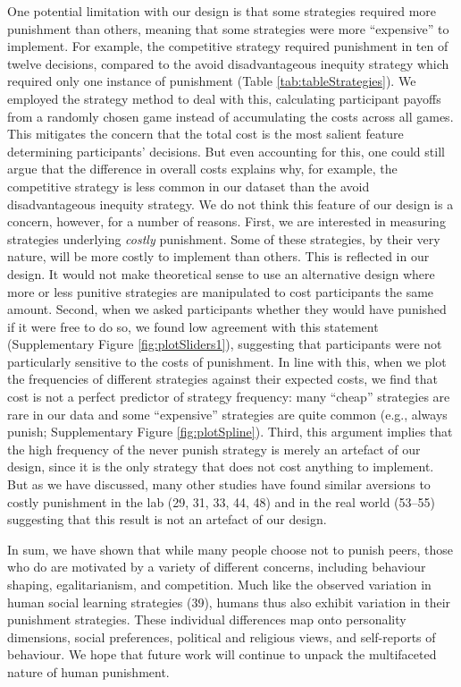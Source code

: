 \documentclass[
  english,
  man, donotrepeattitle,floatsintext]{apa6}
\begin{document}
One potential limitation with our design is that some strategies required more
punishment than others, meaning that some strategies were more ``expensive'' to
implement. For example, the competitive strategy required punishment in ten of
twelve decisions, compared to the avoid disadvantageous inequity strategy which
required only one instance of punishment (Table \ref{tab:tableStrategies}).
We employed the strategy method to deal with this, calculating participant
payoffs from a randomly chosen game instead of accumulating the costs across
all games. This mitigates the concern that the total cost is the most salient
feature determining participants' decisions. But even accounting for this,
one could still argue that the difference in overall costs explains why, for
example, the competitive strategy is less common in our dataset than the avoid
disadvantageous inequity strategy. We do not think this feature of our design
is a concern, however, for a number of reasons. First, we are interested in
measuring strategies underlying \emph{costly} punishment. Some of these strategies,
by their very nature, will be more costly to implement than others. This is
reflected in our design. It would not make theoretical sense to use an
alternative design where more or less punitive strategies are manipulated to
cost participants the same amount. Second, when we asked participants whether
they would have punished if it were free to do so, we found low agreement
with this statement (Supplementary Figure \ref{fig:plotSliders1}),
suggesting that participants were not particularly sensitive to the costs of
punishment. In line with this, when we plot the frequencies of different
strategies against their expected costs, we find that cost is not a perfect
predictor of strategy frequency: many ``cheap'' strategies are rare in our
data and some ``expensive'' strategies are quite common (e.g., always punish;
Supplementary Figure \ref{fig:plotSpline}). Third, this argument implies
that the high frequency of the never punish strategy is merely an artefact
of our design, since it is the only strategy that does not cost anything to
implement. But as we have discussed, many other studies have found similar
aversions to costly punishment in the lab (29, 31, 33, 44, 48) and in the real world
(53--55) suggesting that this result is
not an artefact of our design.

In sum, we have shown that while many people choose not to punish peers, those
who do are motivated by a variety of different concerns, including behaviour
shaping, egalitarianism, and competition. Much like the observed variation in
human social learning strategies (39), humans thus also exhibit
variation in their punishment strategies. These individual differences map onto
personality dimensions, social preferences, political and religious views, and
self-reports of behaviour. We hope that future work will continue to unpack the
multifaceted nature of human punishment.
\end{document}
